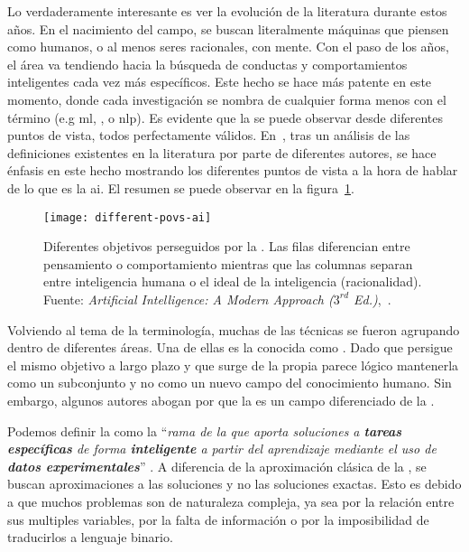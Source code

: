Lo verdaderamente interesante es ver la evolución de la literatura durante estos años. En el nacimiento del campo, se buscan literalmente máquinas que piensen como humanos, o al menos seres racionales, con mente. Con el paso de los años, el área va tendiendo hacia la búsqueda de conductas y comportamientos inteligentes cada vez más específicos. Este hecho se hace más patente en este momento, donde cada investigación se nombra de cualquier forma menos con el término  (e.g \Acrfull{ml}, , o \Acrfull{nlp}). Es evidente que la  se puede observar desde diferentes puntos de vista, todos perfectamente válidos. En~\cite{russell2003artificial}, tras un análisis de las definiciones existentes en la literatura por parte de diferentes autores, se hace énfasis en este hecho mostrando los diferentes puntos de vista a la hora de hablar de lo que es la \gls{ai}. El resumen se puede observar en la figura~\ref{fig:different-povs-ai}.

\begin{figure}[t]
	\texttt{[image: different-povs-ai]}
	\caption[Diferentes objetivos perseguidos por la ]{Diferentes objetivos perseguidos por la . Las filas diferencian entre pensamiento o comportamiento mientras que las columnas separan entre inteligencia humana o el ideal de la inteligencia (racionalidad). Fuente: \textit{Artificial Intelligence: A Modern Approach ($3^{rd}$ Ed.)},~\cite{russell2003artificial}.}
	\label{fig:different-povs-ai}
\end{figure}

Volviendo al tema de la terminología, muchas de las técnicas se fueron agrupando dentro de diferentes áreas. Una de ellas es la conocida como . Dado que persigue el mismo objetivo a largo plazo y que surge de la propia  parece lógico mantenerla como un subconjunto y no como un nuevo campo del conocimiento humano. Sin embargo, algunos autores abogan por que la  es un campo diferenciado de la .

Podemos definir la  como la \enquote{\textit{rama de la  que aporta soluciones a \textbf{tareas específicas} de forma \textbf{inteligente} a partir del aprendizaje mediante el uso de \textbf{datos experimentales}}} \cite{rutkowski2008computational}. A diferencia de la aproximación clásica de la , se buscan aproximaciones a las soluciones y no las soluciones exactas. Esto es debido a que muchos problemas son de naturaleza compleja, ya sea por la relación entre sus multiples variables, por la falta de información o por la imposibilidad de traducirlos a lenguaje binario.

